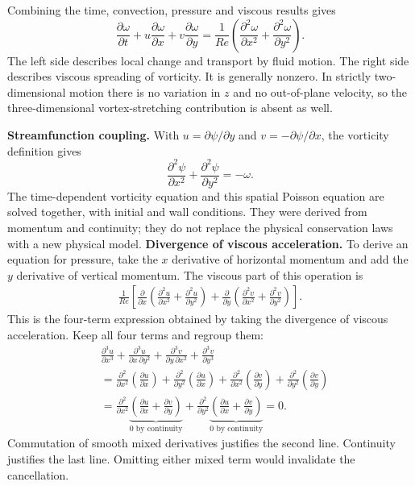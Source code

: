 Combining the time, convection, pressure and viscous results gives
\begin{equation}
\boxed{\frac{\partial\omega}{\partial t}
+u\frac{\partial\omega}{\partial x}+v\frac{\partial\omega}{\partial y}
=\frac{1}{Re}\left(\frac{\partial^2\omega}{\partial x^2}+\frac{\partial^2\omega}{\partial y^2}\right).}
\label{eq:vorticity-full}
\end{equation}
The left side describes local change and transport by fluid motion. The right side describes viscous spreading of vorticity. It is generally nonzero. In strictly two-dimensional motion there is no variation in $z$ and no out-of-plane velocity, so the three-dimensional vortex-stretching contribution is absent as well.

\textbf{Streamfunction coupling.} With $u=\partial\psi/\partial y$ and $v=-\partial\psi/\partial x$, the vorticity definition gives
\[
\frac{\partial^2\psi}{\partial x^2}+\frac{\partial^2\psi}{\partial y^2}=-\omega.
\]
The time-dependent vorticity equation and this spatial Poisson equation are solved together, with initial and wall conditions. They were derived from momentum and continuity; they do not replace the physical conservation laws with a new physical model.
\newpage
{}
\textbf{Divergence of viscous acceleration.} To derive an equation for pressure, take the $x$ derivative of horizontal momentum and add the $y$ derivative of vertical momentum. The viscous part of this operation is
\begin{align*}
\frac{1}{Re}\left[
\frac{\partial}{\partial x}\left(\frac{\partial^2u}{\partial x^2}+\frac{\partial^2u}{\partial y^2}\right)
+\frac{\partial}{\partial y}\left(\frac{\partial^2v}{\partial x^2}+\frac{\partial^2v}{\partial y^2}\right)\right].
\end{align*}
This is the four-term expression obtained by taking the divergence of viscous acceleration. Keep all four terms and regroup them:
\begin{align*}
&\frac{\partial^3u}{\partial x^3}
+\frac{\partial^3u}{\partial x\,\partial y^2}
+\frac{\partial^3v}{\partial y\,\partial x^2}
+\frac{\partial^3v}{\partial y^3}\\
&=\frac{\partial^2}{\partial x^2}\left(\frac{\partial u}{\partial x}\right)
+\frac{\partial^2}{\partial y^2}\left(\frac{\partial u}{\partial x}\right)
+\frac{\partial^2}{\partial x^2}\left(\frac{\partial v}{\partial y}\right)
+\frac{\partial^2}{\partial y^2}\left(\frac{\partial v}{\partial y}\right)\\
&=\frac{\partial^2}{\partial x^2}\underbrace{\left(\frac{\partial u}{\partial x}+\frac{\partial v}{\partial y}\right)}_{0\text{ by continuity}}
+\frac{\partial^2}{\partial y^2}\underbrace{\left(\frac{\partial u}{\partial x}+\frac{\partial v}{\partial y}\right)}_{0\text{ by continuity}}=0.
\end{align*}
Commutation of smooth mixed derivatives justifies the second line. Continuity justifies the last line. Omitting either mixed term would invalidate the cancellation.

